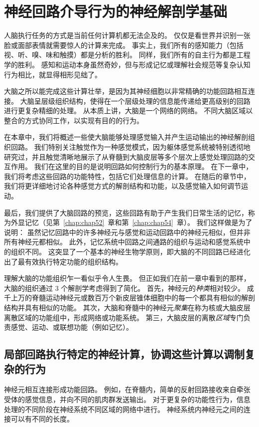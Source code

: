 \chapter{神经回路介导行为的神经解剖学基础} \label{chap:chap4}

人脑执行任务的方式是当前任何计算机都无法企及的。
仅仅是看世界并识别一张脸或面部表情就需要惊人的计算来完成。
事实上，我们所有的感知能力（包括视、听、嗅、味和触摸）都是分析的胜利。
同样，我们所有的自主行为都是工程学的胜利。
感知和运动本身虽然奇妙，但与形成记忆或理解社会规范等复杂认知行为相比，就显得相形见绌了。


大脑之所以能完成这些计算壮举，是因为其神经细胞以非常精确的功能回路相互连接。
大脑呈层级组织结构，使得在一个层级处理的信息能传递给更高级别的回路进行更复杂精细的处理。
从本质上讲，大脑是一个网络的网络。
不同大脑区域以整合的方式协同工作，以实现有目的的行为。


在本章中，我们将概述一些使大脑能够处理感觉输入并产生运动输出的神经解剖组织回路。
我们特别关注触觉作为一种感觉模式，因为躯体感觉系统被特别透彻地研究过，并且触觉清晰地展示了从脊髓到大脑皮层等多个层次上感觉处理回路的交互作用。
我们在这里的目的是说明回路如何控制行为的基本原理。 
在下一章中，我们将考虑这些回路的功能特性，包括它们处理信息的计算。 
在随后的章节中，我们将更详细地讨论各种感觉方式的解剖结构和功能，以及感觉输入如何调节运动。


最后，我们提供了大脑回路的预览，这些回路有助于产生我们日常生活的记忆，称为外显记忆（见第~\ref{chap:chap52}~章和第~\ref{chap:chap54}~章）。
我们这样做是为了说明：
虽然记忆回路中的许多神经元与感觉和运动回路中的神经元相似，但并非所有神经元都相似。
此外，记忆系统中回路之间通路的组织与运动和感觉系统中的组织不同。
这突显了一个基本的神经生物学原则，即大脑的不同回路已经进化出了最有效执行特定功能的组织结构。


理解大脑的功能组织乍一看似乎令人生畏。 
但正如我们在前一章中看到的那样，大脑的组织通过 3 个解剖学考虑得到了简化。
首先，神经元的\textit{种类}相对较少。
成千上万的脊髓运动神经元或数百万个新皮层锥体细胞中的每一个都具有相似的解剖结构并具有相似的功能。 
其次，大脑和脊髓中的神经元\textit{聚集}在称为核或大脑皮层离散区域的功能组中，形成网络或功能系统。 
第三，大脑皮层的离散\textit{区域}专门负责感觉、运动、或联想功能（例如记忆）。


\section{局部回路执行特定的神经计算，协调这些计算以调制复杂的行为}

神经元相互连接形成功能回路。 
例如，在脊髓内，简单的反射回路接收来自牵张受体的感觉信息，并向不同的肌肉群发送输出。
对于更复杂的功能性行为，信息处理的不同阶段在神经系统不同区域的网络中进行。
神经系统内神经元之间的连接可以有不同的长度。


